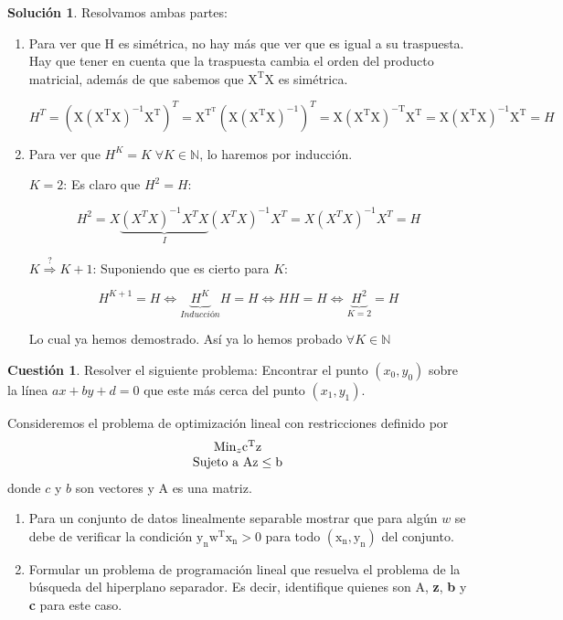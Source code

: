 \documentclass[a4paper, 11pt]{article}
\theoremstyle{definition}
\newtheorem{cuestion}{Cuestión}
\newtheorem*{solucion}{Solución}
\begin{document}
  \begin{solucion}
    Resolvamos ambas partes:
    \begin{enumerate}
      \item Para ver que H es simétrica, no hay más que ver que es igual a su traspuesta. Hay que tener en cuenta que la traspuesta cambia el orden del producto matricial, además de que sabemos que $\mathrm{X^TX}$ es simétrica.

      $$H^T = \left(\mathrm{X(X^TX)^{-1}X^T} \right) ^T = \mathrm{X^{T^T}} \left( \mathrm{X(X^TX)^{-1}}\right)^T = \mathrm{X(X^TX)^{-T}X^T} = \mathrm{X(X^TX)^{-1}X^T} = H$$

      \item Para ver que $H^K = K \; \forall K \in \mathbb{N}$, lo haremos por inducción.

      \underline{$K = 2$}: Es claro que $H^2=H$:

      $$H^2 = X\underbrace{(X^TX)^{-1}X^TX}_{I}(X^TX)^{-1}X^T = X(X^TX)^{-1}X^T = H$$

      \underline{$K \overset{?}{\Rightarrow} K + 1$}: Suponiendo que es cierto para $K$:

      $$H^{K+1} = H \Leftrightarrow \underbrace{H^K}_{Inducción} H = H \Leftrightarrow H H = H \Leftrightarrow \underbrace{H^2}_{K=2}=H$$

      Lo cual ya hemos demostrado. Así ya lo hemos probado $\forall K \in \mathbb{N}$

    \end{enumerate}

  \end{solucion}

  \begin{cuestion}
    Resolver el siguiente problema: Encontrar el punto $(x_0,y_0)$ sobre la línea $ax+by+d=0$ que este más cerca del punto $(x_1,y_1)$.
    \item Consideremos el problema de optimización lineal con restricciones definido por
    \[
    \begin{array}{c}
    \text{Min}_{z} \mathrm{c^Tz} \\
    \hbox{Sujeto a } \mathrm{Az \leq b}
    \end{array}
    \]
    donde $c$ y $b$ son vectores y A es una matriz.

         \begin{enumerate}
            \item Para un conjunto de datos linealmente separable mostrar que para algún $w$ se debe de verificar la condición  $\mathrm{y_nw^Tx_n>0 }$ para todo $\mathrm{(x_n,y_n)}$ del conjunto.
            \item Formular un problema de programación lineal que resuelva el problema de la búsqueda del hiperplano separador. Es decir, identifique quienes son A, \textbf{z}, \textbf{b} y \textbf{c} para este caso.
        \end{enumerate}
  \end{cuestion}
\end{document}
